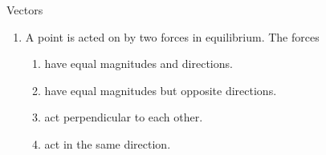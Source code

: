 \begin{eocexercises}{Vectors}\noindent
\begin{enumerate}[noitemsep, label=\textbf{\arabic*}.]
          \label{m38819*uid92}\item A point is acted on by two forces in equilibrium. The forces
\label{m38819*id197705}\begin{enumerate}[noitemsep, label=\textbf{\alph*}. ] 
            \label{m38819*uid93}\item have equal magnitudes and directions.
\label{m38819*uid94}\item have equal magnitudes but opposite directions.
\label{m38819*uid95}\item act perpendicular to each other.
\label{m38819*uid96}\item act in the same direction.
\end{enumerate}

\end{enumerate}
\end{eocexercises}

